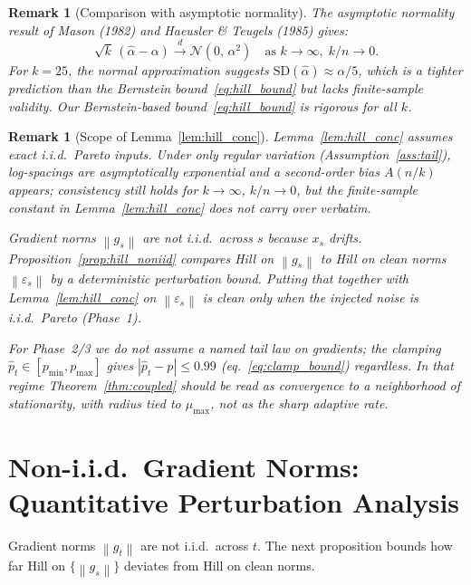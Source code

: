 \documentclass[11pt]{article}
\newtheorem{remark}[theorem]{Remark}
\theoremstyle{definition}
\newcommand{\norm}[1]{\left\| #1 \right\|}
\newcommand{\abs}[1]{\left| #1 \right|}
\newcommand{\phat}{\hat{p}}
\newcommand{\ahat}{\hat{\alpha}}
\begin{document}
\begin{remark}[Comparison with asymptotic normality]\label{rem:asymptotic}
The asymptotic normality result of Mason (1982) and Haeusler \& Teugels (1985) gives:
\[
  \sqrt{k}\,(\ahat - \alpha) \xrightarrow{d} \mathcal{N}(0,\, \alpha^2)
  \quad\text{as } k \to \infty,\; k/n \to 0.
\]
For $k = 25$, the normal approximation suggests $\mathrm{SD}(\ahat) \approx \alpha/5$,
which is a tighter prediction than the Bernstein bound~\eqref{eq:hill_bound}
but lacks finite-sample validity. Our Bernstein-based bound~\eqref{eq:hill_bound}
is rigorous for all $k$.
\end{remark}

\begin{remark}[Scope of Lemma~\ref{lem:hill_conc}]\label{rem:beyond_pareto}
Lemma~\ref{lem:hill_conc} assumes exact i.i.d.\ Pareto inputs. Under only
regular variation \textup{(}Assumption~\ref{ass:tail}\textup{)}, log-spacings
are asymptotically exponential and a second-order bias $A(n/k)$ appears;
consistency still holds for $k\to\infty$, $k/n\to 0$, but the finite-sample
constant in Lemma~\ref{lem:hill_conc} does not carry over verbatim.

Gradient norms $\norm{g_s}$ are not i.i.d.\ across $s$ because $x_s$ drifts.
Proposition~\ref{prop:hill_noniid} compares Hill on $\norm{g_s}$ to Hill on
clean norms $\norm{\varepsilon_s}$ by a deterministic perturbation bound.
Putting that together with Lemma~\ref{lem:hill_conc} on $\norm{\varepsilon_s}$
is clean only when the injected noise is i.i.d.\ Pareto \textup{(}Phase~1\textup{)}.

For Phase~2/3 we do not assume a named tail law on gradients; the clamping
$\phat_t\in[p_{\min},p_{\max}]$ gives $\abs{\phat_t-p}\leq 0.99$
\textup{(}eq.~\eqref{eq:clamp_bound}\textup{)} regardless. In that regime
Theorem~\ref{thm:coupled} should be read as convergence to a neighborhood of
stationarity, with radius tied to $\mu_{\max}$, not as the sharp adaptive rate.
\end{remark}


\section{Non-i.i.d.\ Gradient Norms: Quantitative Perturbation Analysis}
\label{sec:noniid}

Gradient norms $\norm{g_t}$ are not i.i.d.\ across $t$. The next proposition
bounds how far Hill on $\{\norm{g_s}\}$ deviates from Hill on clean norms.
\end{document}
